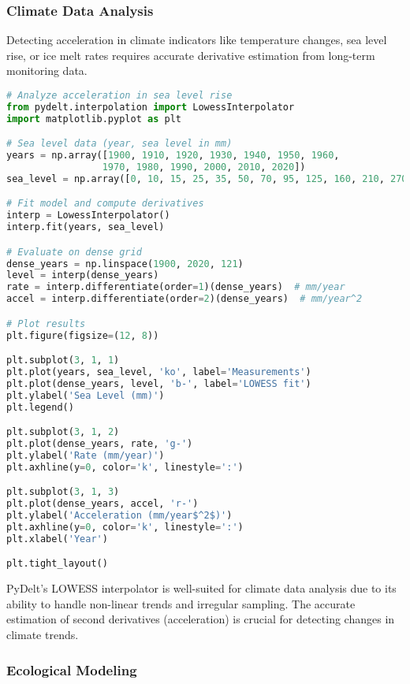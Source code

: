 \documentclass[11pt,a4paper]{article}
\begin{document}
\subsubsection{Climate Data Analysis}

Detecting acceleration in climate indicators like temperature changes, sea level rise, or ice melt rates requires accurate derivative estimation from long-term monitoring data.

\begin{lstlisting}[language=Python, caption=Climate data analysis example]
# Analyze acceleration in sea level rise
from pydelt.interpolation import LowessInterpolator
import matplotlib.pyplot as plt

# Sea level data (year, sea level in mm)
years = np.array([1900, 1910, 1920, 1930, 1940, 1950, 1960, 
                 1970, 1980, 1990, 2000, 2010, 2020])
sea_level = np.array([0, 10, 15, 25, 35, 50, 70, 95, 125, 160, 210, 270, 340])

# Fit model and compute derivatives
interp = LowessInterpolator()
interp.fit(years, sea_level)

# Evaluate on dense grid
dense_years = np.linspace(1900, 2020, 121)
level = interp(dense_years)
rate = interp.differentiate(order=1)(dense_years)  # mm/year
accel = interp.differentiate(order=2)(dense_years)  # mm/year^2

# Plot results
plt.figure(figsize=(12, 8))

plt.subplot(3, 1, 1)
plt.plot(years, sea_level, 'ko', label='Measurements')
plt.plot(dense_years, level, 'b-', label='LOWESS fit')
plt.ylabel('Sea Level (mm)')
plt.legend()

plt.subplot(3, 1, 2)
plt.plot(dense_years, rate, 'g-')
plt.ylabel('Rate (mm/year)')
plt.axhline(y=0, color='k', linestyle=':')

plt.subplot(3, 1, 3)
plt.plot(dense_years, accel, 'r-')
plt.ylabel('Acceleration (mm/year$^2$)')
plt.axhline(y=0, color='k', linestyle=':')
plt.xlabel('Year')

plt.tight_layout()
\end{lstlisting}

PyDelt's LOWESS interpolator is well-suited for climate data analysis due to its ability to handle non-linear trends and irregular sampling. The accurate estimation of second derivatives (acceleration) is crucial for detecting changes in climate trends.

\subsubsection{Ecological Modeling}
\end{document}
